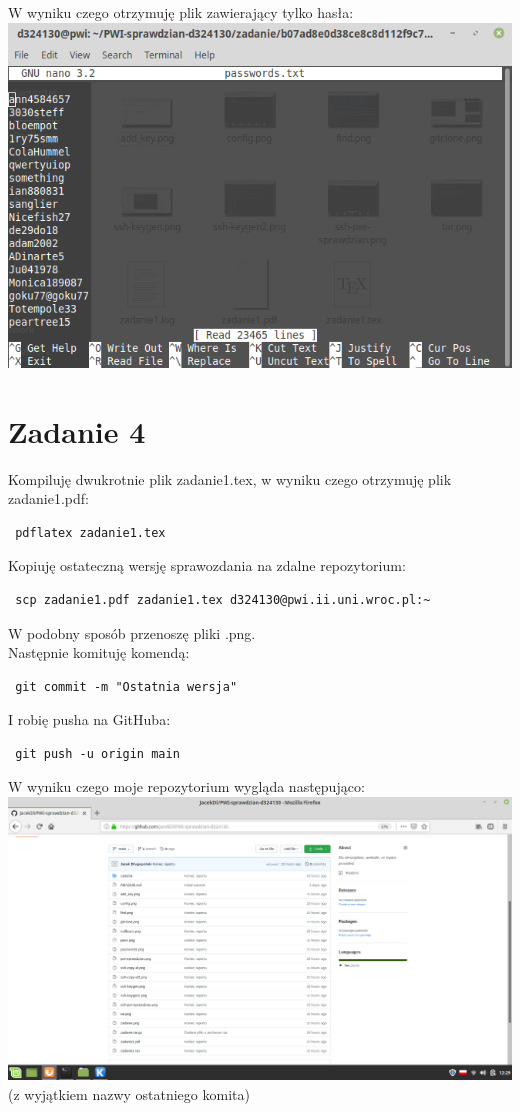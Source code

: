 \documentclass{article}
\begin{document}
\begin{enumerate}
 W wyniku czego otrzymuję plik zawierający tylko hasła:\\
 \includegraphics[scale=0.4]{pass.png}

\section*{Zadanie 4}
Kompiluję dwukrotnie plik zadanie1.tex, w wyniku czego otrzymuję plik zadanie1.pdf:
\begin{verbatim}
 pdflatex zadanie1.tex
\end{verbatim}

Kopiuję ostateczną wersję sprawozdania na zdalne repozytorium\cite{scp}:
\begin{verbatim}
 scp zadanie1.pdf zadanie1.tex d324130@pwi.ii.uni.wroc.pl:~
\end{verbatim}
W podobny sposób przenoszę pliki .png.\\
Następnie komituję komendą:
\begin{verbatim}
 git commit -m "Ostatnia wersja"
\end{verbatim}
I robię pusha na GitHuba:
\begin{verbatim}
 git push -u origin main
\end{verbatim}
W wyniku czego moje repozytorium wygląda następująco:\\
\includegraphics[scale=0.2]{git.png}\\
(z wyjątkiem nazwy ostatniego komita)










 \end{enumerate}
\end{document}
